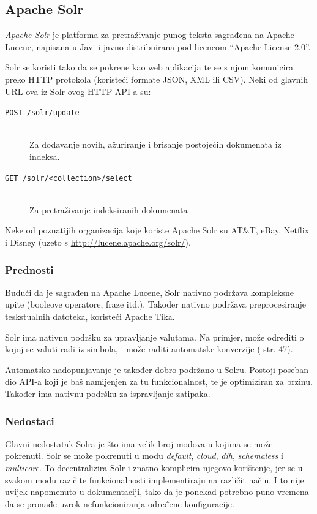 \documentclass[a4paper,twoside,12pt]{scrreprt}
\begin{document}
\subsection{Apache Solr}

\textit{Apache Solr} je platforma za pretraživanje punog teksta sagrađena na Apache Lucene, napisana u Javi i javno distribuirana pod licencom ``Apache License 2.0''.

Solr se koristi tako da se pokrene kao web aplikacija te se s njom komunicira preko HTTP protokola (koristeći formate JSON, XML ili CSV). Neki od glavnih URL-ova iz Solr-ovog HTTP API-a su:

\begin{description}
  \item[\texttt{POST /solr/update}] \hfill \\ Za dodavanje novih, ažuriranje i brisanje postojećih dokumenata iz indeksa.
  \item[\texttt{GET /solr/<collection>/select}] \hfill \\ Za pretraživanje indeksiranih dokumenata
\end{description}

Neke od poznatijih organizacija koje koriste Apache Solr su AT\&T, eBay, Netflix i Disney (uzeto s \url{http://lucene.apache.org/solr/}).

\subsubsection{Prednosti}

Budući da je sagrađen na Apache Lucene, Solr nativno podržava kompleksne upite (booleove operatore, fraze itd.). Također nativno podržava preprocesiranje teskstualnih datoteka, koristeći Apache Tika.

Solr ima nativnu podršku za upravljanje valutama. Na primjer, može odrediti o kojoj se valuti radi iz simbola, i može raditi automatske konverzije (\cite{solr} str. 47).

Automatsko nadopunjavanje je također dobro podržano u Solru. Postoji poseban dio API-a koji je baš namijenjen za tu funkcionalnost, te je optimiziran za brzinu. Također ima nativnu podršku za ispravljanje zatipaka.

\subsubsection{Nedostaci}

Glavni nedostatak Solra je što ima velik broj modova u kojima se može pokrenuti. Solr se može pokrenuti u modu \textit{default}, \textit{cloud}, \textit{dih}, \textit{schemaless} i \textit{multicore}. To decentralizira Solr i znatno komplicira njegovo korištenje, jer se u svakom modu razičite funkcionalnosti implementiraju na različit način. I to nije uvijek napomenuto u dokumentaciji, tako da je ponekad potrebno puno vremena da se pronađe uzrok nefunkcioniranja određene konfiguracije.
\end{document}
